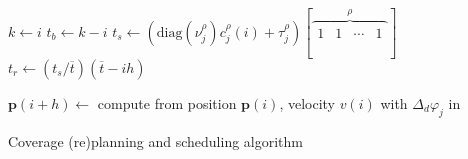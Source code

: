 \begin{algorithm}[h!]
{    {\normalsize $k\gets i$}\;\label{algo:repla:initbat}
    {\normalsize $t_b\gets k-i$}\;\label{algo:repla:endbat}%
    {\normalsize $t_s\gets(\mathrm{diag}(\nu_j^\rho)c_j^\rho(i)+\tau_j^\rho)[\overbrace{\begin{matrix}1&1&\cdots&1\end{matrix}}^{\rho}]$}\;\label{algo:repla:configtime}%
    {\normalsize $t_r\gets(t_s/\overline{t})(\overline{t}-ih)$}\label{algo:repla:loosingmyreligiontime}\;%
    \vspace{.8ex}
    
    {\normalsize $\mathbf{p}(i+h)\gets${ \otherfont compute from position }$\mathbf{p}(i)${\otherfont , velocity }\normalfont $v(i)${ \otherfont with }\normalfont $\Delta_d\varphi_j${ \otherfont in }}\;\label{algo:repla:gvf}
  }
  \vspace{.8ex}

  \caption{Coverage (re)planning and scheduling algorithm}
  \label{algo:repla}
\end{algorithm}

